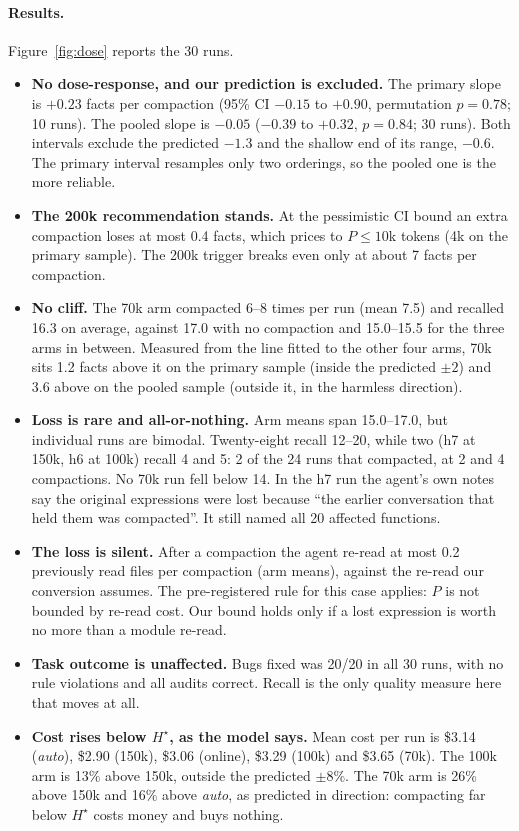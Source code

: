 \documentclass[11pt]{article}
\begin{document}
\paragraph{Results.} Figure~\ref{fig:dose} reports the 30 runs.
\begin{itemize}
\item \textbf{No dose-response, and our prediction is excluded.} The primary slope is $+0.23$ facts per compaction (95\% CI $-0.15$ to $+0.90$, permutation $p=0.78$; 10 runs). The pooled slope is $-0.05$ ($-0.39$ to $+0.32$, $p=0.84$; 30 runs). Both intervals exclude the predicted $-1.3$ and the shallow end of its range, $-0.6$. The primary interval resamples only two orderings, so the pooled one is the more reliable.
\item \textbf{The 200k recommendation stands.} At the pessimistic CI bound an extra compaction loses at most 0.4 facts, which prices to $P\le10$k tokens (4k on the primary sample). The 200k trigger breaks even only at about 7 facts per compaction.
\item \textbf{No cliff.} The 70k arm compacted 6--8 times per run (mean 7.5) and recalled 16.3 on average, against 17.0 with no compaction and 15.0--15.5 for the three arms in between. Measured from the line fitted to the other four arms, 70k sits 1.2 facts above it on the primary sample (inside the predicted $\pm2$) and 3.6 above on the pooled sample (outside it, in the harmless direction).
\item \textbf{Loss is rare and all-or-nothing.} Arm means span 15.0--17.0, but individual runs are bimodal. Twenty-eight recall 12--20, while two (h7 at 150k, h6 at 100k) recall 4 and 5: 2 of the 24 runs that compacted, at 2 and 4 compactions. No 70k run fell below 14. In the h7 run the agent's own notes say the original expressions were lost because ``the earlier conversation that held them was compacted''. It still named all 20 affected functions.
\item \textbf{The loss is silent.} After a compaction the agent re-read at most 0.2 previously read files per compaction (arm means), against the re-read our conversion assumes. The pre-registered rule for this case applies: $P$ is not bounded by re-read cost. Our bound holds only if a lost expression is worth no more than a module re-read.
\item \textbf{Task outcome is unaffected.} Bugs fixed was 20/20 in all 30 runs, with no rule violations and all audits correct. Recall is the only quality measure here that moves at all.
\item \textbf{Cost rises below $H^\star$, as the model says.} Mean cost per run is \$3.14 (\emph{auto}), \$2.90 (150k), \$3.06 (online), \$3.29 (100k) and \$3.65 (70k). The 100k arm is 13\% above 150k, outside the predicted $\pm8\%$. The 70k arm is 26\% above 150k and 16\% above \emph{auto}, as predicted in direction: compacting far below $H^\star$ costs money and buys nothing.
\end{itemize}
\end{document}
